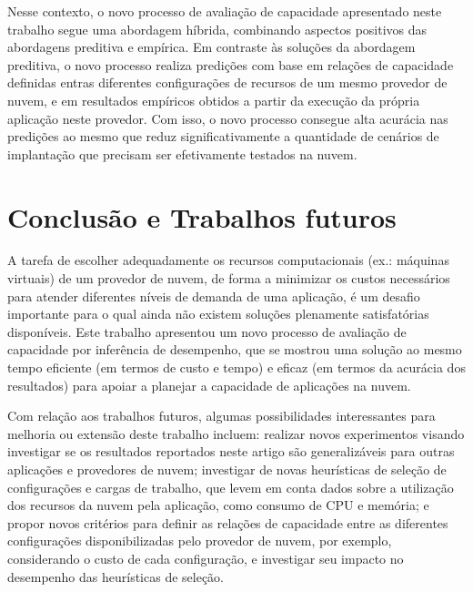 \documentclass[12pt]{article}
\begin{document}
Nesse contexto, o novo processo de avaliação de capacidade apresentado neste trabalho segue uma abordagem híbrida, combinando aspectos positivos das abordagens preditiva e empírica. Em contraste às soluções da abordagem preditiva, o novo processo realiza predições com base em relações de capacidade definidas entras diferentes configurações de recursos de um mesmo provedor de nuvem, e em resultados empíricos obtidos a partir da execução da própria aplicação neste provedor. Com isso, o novo processo consegue alta acurácia nas predições ao mesmo que reduz significativamente a quantidade de cenários de implantação que precisam ser efetivamente testados na nuvem. 

\section{Conclusão e Trabalhos futuros}\label{sec:conclusion}
A tarefa de escolher adequadamente os recursos computacionais (ex.: máquinas
virtuais) de um provedor de nuvem, de forma a minimizar os custos necessários para atender diferentes níveis de demanda de uma aplicação, é um desafio importante para o qual ainda não existem soluções plenamente satisfatórias disponíveis. Este trabalho apresentou um novo processo de avaliação de capacidade por inferência de desempenho, que se mostrou uma solução ao mesmo tempo eficiente (em termos de custo e tempo) e eficaz (em termos da acurácia dos resultados) para apoiar a planejar a capacidade de aplicações na nuvem. 


Com relação aos trabalhos futuros, algumas possibilidades interessantes para melhoria ou extensão deste trabalho incluem: realizar novos experimentos visando investigar se os resultados reportados neste artigo são generalizáveis para outras aplicações e provedores de nuvem; investigar de novas heurísticas de seleção de configurações e cargas de trabalho, que levem em conta dados sobre a utilização dos recursos da nuvem pela aplicação, como consumo de CPU e memória; e propor novos critérios para definir as relações de capacidade entre as diferentes configurações disponibilizadas pelo provedor de nuvem, por exemplo, considerando o custo de cada configuração, e investigar seu impacto no desempenho das heurísticas de seleção.




\end{document}
